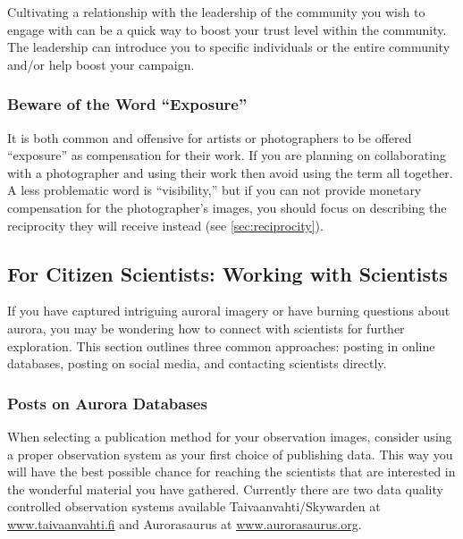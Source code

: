 \documentclass{article}
\newcommand{\contributed}[1]{%
    \par\noindent
    \begingroup
    \setlength{\leftskip}{1em}%
    \itshape
    Contributors: #1
    \par
    \endgroup
    \vspace{0.5em}
}
\begin{document}
Cultivating a relationship with the leadership of the community you wish to engage with can be a quick way to boost your trust level within the community. The leadership can introduce you to specific individuals or the entire community and/or help boost your campaign.

\subsubsection{Beware of the Word ``Exposure''}
It is both common and offensive for artists or photographers to be offered ``exposure'' as compensation for their work. If you are planning on collaborating with a photographer and using their work then avoid using the term all together. A less problematic word is ``visibility,'' but if you can not provide monetary compensation for the photographer's images, you should focus on describing the reciprocity they will receive instead (see \ref{sec:reciprocity}).

\subsection{For Citizen Scientists: Working with Scientists} 


If you have captured intriguing auroral imagery or have burning questions about aurora, you may be wondering how to connect with scientists for further exploration. This section outlines three common approaches: posting in online databases, posting on social media, and contacting scientists directly.

\subsubsection{Posts on Aurora Databases} 

When selecting a publication method for your observation images, consider using a proper observation system as your first choice of publishing data. This way you will have the best possible chance for reaching the scientists that are interested in the wonderful material you have gathered. Currently there are two data quality controlled observation systems available Taivaanvahti/Skywarden at \href{www.taivaanvahti.fi}{www.taivaanvahti.fi} and Aurorasaurus at \href{www.aurorasaurus.org}{www.aurorasaurus.org}.
\end{document}
